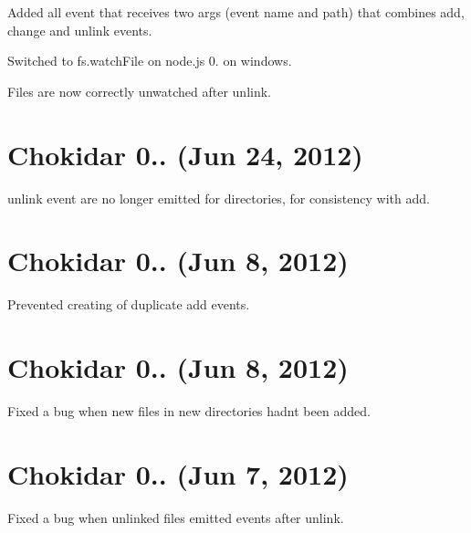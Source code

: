 \begin{DoxyItemize}
\item Added {\ttfamily all} event that receives two args (event name and path) that combines {\ttfamily add}, {\ttfamily change} and {\ttfamily unlink} events.
\item Switched to {\ttfamily fs.\+watch\+File} on node.\+js 0. on windows.
\item Files are now correctly unwatched after unlink.
\end{DoxyItemize}

\section*{Chokidar 0.. (Jun 24, 2012)}


\begin{DoxyItemize}
\item {\ttfamily unlink} event are no longer emitted for directories, for consistency with {\ttfamily add}.
\end{DoxyItemize}

\section*{Chokidar 0.. (Jun 8, 2012)}


\begin{DoxyItemize}
\item Prevented creating of duplicate \textquotesingle{}add\textquotesingle{} events.
\end{DoxyItemize}

\section*{Chokidar 0.. (Jun 8, 2012)}


\begin{DoxyItemize}
\item Fixed a bug when new files in new directories hadn\textquotesingle{}t been added.
\end{DoxyItemize}

\section*{Chokidar 0.. (Jun 7, 2012)}


\begin{DoxyItemize}
\item Fixed a bug when unlinked files emitted events after unlink.
\end{DoxyItemize}

